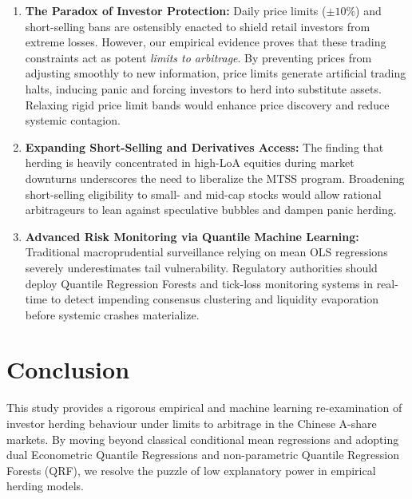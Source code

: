 \documentclass[12pt, a4paper]{article}
\begin{document}
\begin{enumerate}[label=\arabic*.]
  \item \textbf{The Paradox of Investor Protection:} Daily price limits ($\pm10\%$) and short-selling bans are ostensibly enacted to shield retail investors from extreme losses. However, our empirical evidence proves that these trading constraints act as potent \emph{limits to arbitrage}. By preventing prices from adjusting smoothly to new information, price limits generate artificial trading halts, inducing panic and forcing investors to herd into substitute assets. Relaxing rigid price limit bands would enhance price discovery and reduce systemic contagion.

  \item \textbf{Expanding Short-Selling and Derivatives Access:} The finding that herding is heavily concentrated in high-LoA equities during market downturns underscores the need to liberalize the MTSS program. Broadening short-selling eligibility to small- and mid-cap stocks would allow rational arbitrageurs to lean against speculative bubbles and dampen panic herding.

  \item \textbf{Advanced Risk Monitoring via Quantile Machine Learning:} Traditional macroprudential surveillance relying on mean OLS regressions severely underestimates tail vulnerability. Regulatory authorities should deploy Quantile Regression Forests and tick-loss monitoring systems in real-time to detect impending consensus clustering and liquidity evaporation before systemic crashes materialize.
\end{enumerate}

\section{Conclusion}

This study provides a rigorous empirical and machine learning re-examination of investor herding behaviour under limits to arbitrage in the Chinese A-share markets. By moving beyond classical conditional mean regressions and adopting dual Econometric Quantile Regressions and non-parametric Quantile Regression Forests (QRF), we resolve the puzzle of low explanatory power in empirical herding models.
\end{document}
